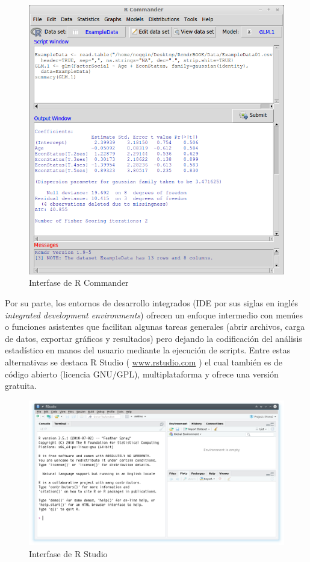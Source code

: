 \documentclass[a4paper]{book}
\begin{document}
\begin{figure}[h]

{\centering \includegraphics[width=0.75\linewidth,]{images/RcmdrBASE} 

}

\caption{Interfase de R Commander}\label{fig:unnamed-chunk-4}
\end{figure}

Por su parte, los entornos de desarrollo integrados (IDE por sus siglas
en inglés \emph{integrated development environments}) ofrecen un enfoque
intermedio con menúes o funciones asistentes que facilitan algunas
tareas generales (abrir archivos, carga de datos, exportar gráficos y
resultados) pero dejando la codificación del análisis estadístico en
manos del usuario mediante la ejecución de scripts. Entre estas
alternativas se destaca R Studio ( \url{www.rstudio.com} ) el cual
también es de código abierto (licencia GNU/GPL), multiplataforma y
ofrece una versión gratuita.

\begin{figure}[h]

{\centering \includegraphics[width=0.75\linewidth,]{images/RStudio} 

}

\caption{Interfase de R Studio}\label{fig:unnamed-chunk-5}
\end{figure}
\end{document}
